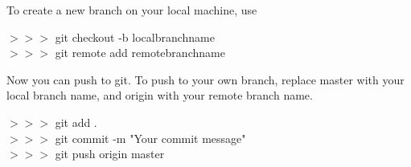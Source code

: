 To create a new branch on your local machine, use
\begin{mdframed}
$>>>$ \quad git checkout -b localbranchname\\
$>>>$ \quad git remote add remotebranchname
\end{mdframed}

Now you can push to git. To push to your own branch, replace master with your local branch name, and origin with your remote branch name.

\begin{mdframed}
$>>>$ \quad git add .\\
$>>>$ \quad git commit -m "Your commit message"\\
$>>>$ \quad git push origin master
\end{mdframed}







